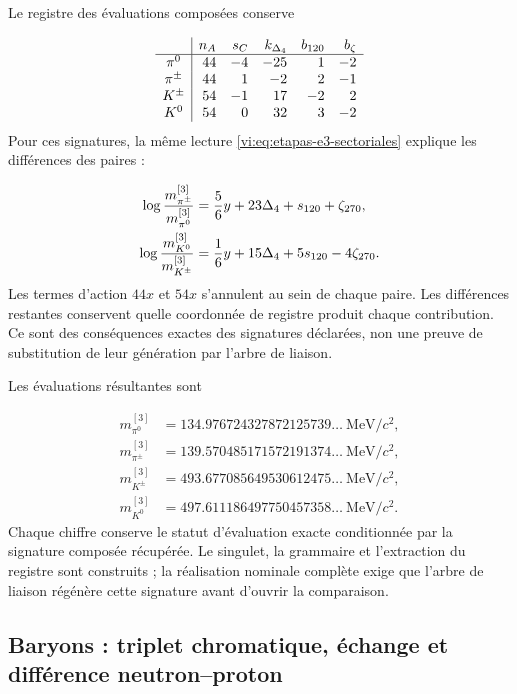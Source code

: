 Le registre des évaluations composées conserve

\[
\begin{array}{c|r r r r r}
 &n_A&s_C&k_{\Delta_4}&b_{120}&b_\zeta\\\hline
 \pi^0&44&-4&-25&1&-2\\
 \pi^\pm&44&1&-2&2&-1\\
 K^\pm&54&-1&17&-2&2\\
 K^0&54&0&32&3&-2
\end{array}
\]
Pour ces signatures, la même lecture \eqref{vi:eq:etapas-e3-sectoriales}
explique les différences des paires :

\begin{align}
 \log\frac{m_{\pi^\pm}^{[3]}}{m_{\pi^0}^{[3]}}
 &=\frac56y+23\Delta_4+s_{120}+\zeta_{270},\notag\\
 \log\frac{m_{K^0}^{[3]}}{m_{K^\pm}^{[3]}}
 &=\frac16y+15\Delta_4+5s_{120}-4\zeta_{270}.
 \label{vi:eq:desdoblamientos-mesonicos}
\end{align}
Les termes d’action \(44x\) et \(54x\) s’annulent au sein de
chaque paire. Les différences restantes conservent quelle coordonnée de
registre produit chaque contribution. Ce sont des conséquences exactes des
signatures déclarées, non une preuve de substitution de leur génération par l’arbre
de liaison.


Les évaluations résultantes sont

\begin{align*}
 m_{\pi^0}^{[3]}&=134.976724327872125739\ldots\ \mathrm{MeV}/c^2,\\
 m_{\pi^\pm}^{[3]}&=139.570485171572191374\ldots\ \mathrm{MeV}/c^2,\\
 m_{K^\pm}^{[3]}&=493.677085649530612475\ldots\ \mathrm{MeV}/c^2,\\
 m_{K^0}^{[3]}&=497.611186497750457358\ldots\ \mathrm{MeV}/c^2.
\end{align*}
Chaque chiffre conserve le
statut d’évaluation exacte conditionnée par la signature composée
récupérée. Le singulet, la grammaire et l’extraction du registre sont
construits ; la réalisation nominale complète exige que l’arbre de
liaison régénère cette signature avant d’ouvrir la comparaison.


\subsection{Baryons : triplet chromatique, échange et différence neutron--proton
}
\label{vi:subsec:bariones-familias}

